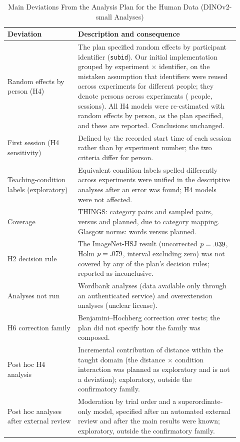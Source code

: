 \documentclass[11pt]{article}
\begin{document}
\begin{table}[!htbp]
\centering\footnotesize
\begin{tabular}{p{0.28\linewidth}p{0.64\linewidth}}
\toprule
Deviation & Description and consequence \\
\midrule
Random effects by person (H4) & The plan specified random effects by participant identifier (\texttt{subid}). Our initial implementation grouped by experiment $\times$ identifier, on the mistaken assumption that identifiers were reused across experiments for different people; they denote persons across experiments (\HFourPersons{} people, \HFourSessions{} sessions). All H4 models were re-estimated with random effects by person, as the plan specified, and these are reported. Conclusions unchanged. \\
First session (H4 sensitivity) & Defined by the recorded start time of each session rather than by experiment number; the two criteria differ for \FirstSessDiff{} person. \\
Teaching-condition labels (exploratory) & Equivalent condition labels spelled differently across experiments were unified in the descriptive analyses after an error was found; H4 models were not affected. \\
Coverage & THINGS: \CovThingsPairs{} category pairs and \HTwoThingsN{} sampled pairs, versus \CovThingsPairsPlan{} and \CovThingsNPlan{} planned, due to category mapping. Glasgow norms: \HFiveHundredN{} words versus \CovGlasgowPlan{} planned. \\
H2 decision rule & The ImageNet-HSJ result (uncorrected $p = .039$, Holm $p = .079$, interval excluding zero) was not covered by any of the plan's decision rules; reported as inconclusive. \\
Analyses not run & Wordbank analyses (data available only through an authenticated service) and overextension analyses (unclear license). \\
H6 correction family & Benjamini--Hochberg correction over \HSixBHTests{} tests; the plan did not specify how the family was composed. \\
Post hoc H4 analysis & Incremental contribution of distance within the taught domain (the distance $\times$ condition interaction was planned as exploratory and is not a deviation); exploratory, outside the confirmatory family. \\
Post hoc analyses after external review & Moderation by trial order and a superordinate-only model, specified after an automated external review and after the main results were known; exploratory, outside the confirmatory family. \\
\bottomrule
\end{tabular}
\caption{Main Deviations From the Analysis Plan for the Human Data (DINOv2-small Analyses)}
\label{tab:dev}
\end{table}
\end{document}

